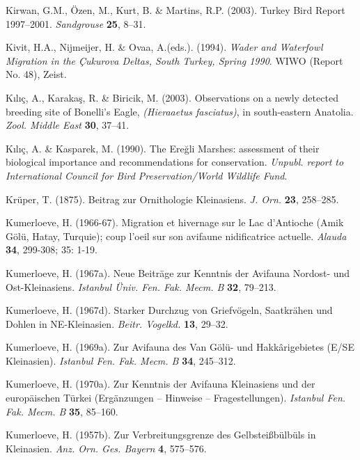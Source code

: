 \documentclass[
  a4paper,
  DIV=11,
  numbers=noendperiod]{scrreprt}
\newlength{\cslhangindent}
\newenvironment{CSLReferences}[2] %
 {\begin{list}{}{%
  \setlength{\itemindent}{0pt}
  \setlength{\leftmargin}{0pt}
  \setlength{\parsep}{0pt}
  \ifodd #1
   \setlength{\leftmargin}{\cslhangindent}
   \setlength{\itemindent}{-1\cslhangindent}
  \fi
  \setlength{\itemsep}{#2\baselineskip}}}
 {\end{list}}
\begin{document}
\begin{CSLReferences}{1}{1}
Kirwan, G.M., Özen, M., Kurt, B. \& Martins, R.P. (2003). {Turkey Bird
Report 1997--2001}. \emph{Sandgrouse} \textbf{25}, 8--31.

Kivit, H.A., Nijmeijer, H. \& Ovaa, A.(eds.). (1994). \emph{{Wader and
Waterfowl Migration in the Çukurova Deltas, South Turkey, Spring 1990}}.
WIWO (Report No. 48), Zeist.

Kılıç, A., Karakaş, R. \& Biricik, M. (2003). {Observations on a newly
detected breeding site of Bonelli's Eagle, \emph{(Hieraaetus
fasciatus)}, in south-eastern Anatolia}. \emph{Zool. Middle East}
\textbf{30}, 37--41.

Kılıç, A. \& Kasparek, M. (1990). {The Ereğli Marshes: assessment of
their biological importance and recommendations for conservation}.
\emph{Unpubl. report to International Council for Bird
Preservation/World Wildlife Fund}.

Krüper, T. (1875). {Beitrag zur Ornithologie Kleinasiens}. \emph{J.
Orn.} \textbf{23}, 258--285.

Kumerloeve, H. (1966-67). {Migration et hivernage sur le Lac d'Antioche
(Amik Gölü, Hatay, Turquie); coup l'oeil sur son avifaune nidificatrice
actuelle}. \emph{Alauda} \textbf{34}, 299-308; 35: 1-19.

Kumerloeve, H. (1967a). {Neue Beiträge zur Kenntnis der Avifauna
Nordost- und Ost-Kleinasiens}. \emph{Istanbul Üniv. Fen. Fak. Mecm. B}
\textbf{32}, 79--213.

Kumerloeve, H. (1967d). {Starker Durchzug von Griefvögeln, Saatkrähen
und Dohlen in NE-Kleinasien}. \emph{Beitr. Vogelkd.} \textbf{13},
29--32.

Kumerloeve, H. (1969a). {Zur Avifauna des Van Gölü- und Hakkârigebietes
(E/SE Kleinasien)}. \emph{Istanbul Fen. Fak. Mecm. B} \textbf{34},
245--312.

Kumerloeve, H. (1970a). {Zur Kenntnis der Avifauna Kleinasiens und der
europäischen Türkei (Ergänzungen -- Hinweise -- Fragestellungen)}.
\emph{Istanbul Fen. Fak. Mecm. B} \textbf{35}, 85--160.

Kumerloeve, H. (1957b). {Zur Verbreitungsgrenze des Gelbsteißbülbüls in
Kleinasien}. \emph{Anz. Orn. Ges. Bayern} \textbf{4}, 575--576.


\end{CSLReferences}
\end{document}
